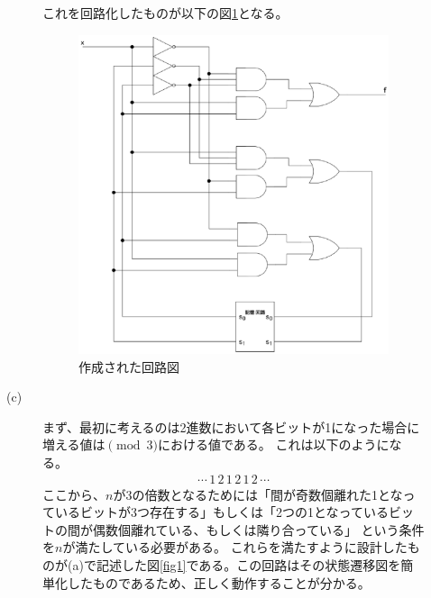 \documentclass{jsarticle}
\begin{document}
\begin{description}
\begin{description}
            これを回路化したものが以下の図\ref{fig3}となる。
            \begin{figure}[H]
                \centering
                \includegraphics[width=10cm]{fig_3.eps}
                \caption{作成された回路図}
                \label{fig3}
            \end{figure}

            \item[(c)]
            まず、最初に考えるのは2進数において各ビットが1になった場合に増える値は$\pmod 3$における値である。
            これは以下のようになる。
            \begin{align}
                \cdots \,1\,2\,1\,2\,1\,2\, \cdots
            \end{align}
            ここから、$n$が3の倍数となるためには「間が奇数個離れた1となっているビットが3つ存在する」もしくは「2つの1となっているビットの間が偶数個離れている、もしくは隣り合っている」
            という条件を$n$が満たしている必要がある。
            これらを満たすように設計したものが(a)で記述した図\ref{fig1}である。この回路はその状態遷移図を簡単化したものであるため、正しく動作することが分かる。
        \end{description}


\end{description}
\end{document}
